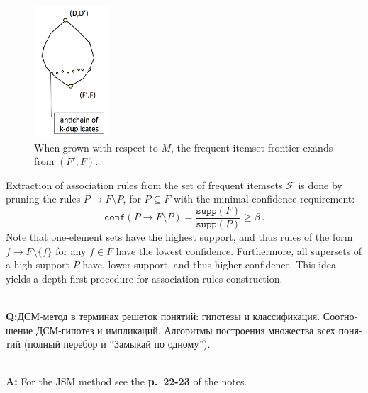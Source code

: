 \documentclass[a4paper]{article}
\newcommand{\Fcal}{\mathcal{F}}
\newcommand{\rus}[1]{\foreignlanguage{russian}{#1}}
\begin{document}
\begin{figure}
    \centering
    \includegraphics[width=0.25\textwidth]{assoc_rules_sublattice.png}
    \caption{When grown with respect to $M$, the frequent itemset frontier
    \label{fig:assoc_rules_lattice}
    exands from $(F', F)$.}
\end{figure}

Extraction of association rules from the set of frequent itemsets $\Fcal$ is done by
pruning the rules $P\to F\setminus P$, for $P\subseteq F$ with the minimal confidence
requirement:
$$ \mathtt{conf}(P \to F\setminus P)
    = \frac{\mathtt{supp}(F)}{\mathtt{supp}(P)} \geq \beta
    \,. $$
Note that one-element sets have the highest support, and thus rules of the form 
$f\to F\setminus \{f\}$ for any $f\in F$ have the lowest confidence. Furthermore,
all supersets of a high-support $P$ have, lower support, and thus higher confidence.
This idea yields a depth-first procedure for association rules construction.

\hfill\\\textbf{Q:}\rus{ДСМ-метод в терминах решеток понятий: гипотезы и классификация.
Соотношение ДСМ-гипотез и импликаций. Алгоритмы построения множества всех понятий (полный
перебор и ``Замыкай по одному'').}

\hfill\\\textbf{A:}
\noindent For the JSM method see the \textbf{p.~22-23} of the notes.
\end{document}
